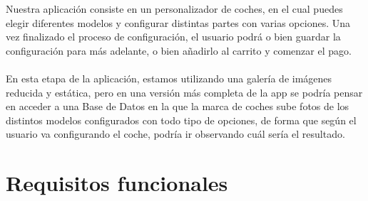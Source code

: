 
Nuestra aplicación consiste en un personalizador de coches, en el cual puedes elegir diferentes modelos y configurar distintas partes con varias opciones. Una vez finalizado el proceso de configuración, el usuario podrá o bien guardar la configuración para más adelante, o bien añadirlo al carrito y comenzar el pago.
\\\\
En esta etapa de la aplicación, estamos utilizando una galería de imágenes reducida y estática, pero en una versión más completa de la app se podría pensar en acceder a una Base de Datos en la que la marca de coches sube fotos de los distintos modelos configurados con todo tipo de opciones, de forma que según el usuario va configurando el coche, podría ir observando cuál sería el resultado.



\section{Requisitos funcionales}


